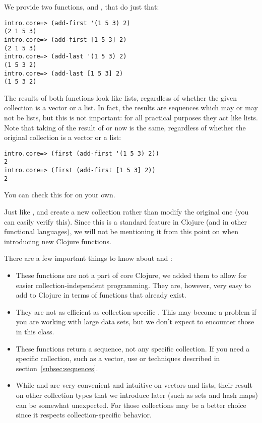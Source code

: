 We provide two functions,  and , that do just that: 
\begin{framed}
\begin{verbatim}
intro.core=> (add-first '(1 5 3) 2)
(2 1 5 3)
intro.core=> (add-first [1 5 3] 2)
(2 1 5 3)
intro.core=> (add-last '(1 5 3) 2)
(1 5 3 2)
intro.core=> (add-last [1 5 3] 2)
(1 5 3 2)
\end{verbatim}
\end{framed}
The results of both functions look like lists, regardless of whether the given collection is a vector or a list. In fact, the results are sequences which may or may not be lists, but this is not important: for all practical purposes they act like lists.  Note that taking  of the result of  or  now is the same, regardless of whether the original collection is a vector or a list:
\begin{framed}
\begin{verbatim}
intro.core=> (first (add-first '(1 5 3) 2))
2
intro.core=> (first (add-first [1 5 3] 2))
2
\end{verbatim}
\end{framed}
You can check this for  on your own. 

Just like ,  and  create a new collection rather than modify the original one (you can easily verify this). Since this is a standard feature in Clojure (and in other functional languages), we will not be mentioning it from this point on when introducing new Clojure functions.  

There are a few important things to know about  and :
\begin{itemize}
\item These functions are not a part of core Clojure, we added them to allow for easier collection-independent programming. They are, however, very easy to add to Clojure in terms of functions that already exist. 
\item They are not as efficient as collection-specific . This may become a problem if you are working with large data sets, but we don't expect to encounter those in this class. 
\item These functions return a sequence, not any specific collection. If you need a specific collection, such as a vector, use  or techniques described in section~\ref{subsec:sequences}.
\item While   and  are very convenient and intuitive on vectors and lists, their result on other  collection types that we introduce later (such as sets and hash maps) can be somewhat unexpected. For those collections  may be a better choice since it respects collection-specific behavior. 
\end{itemize}

